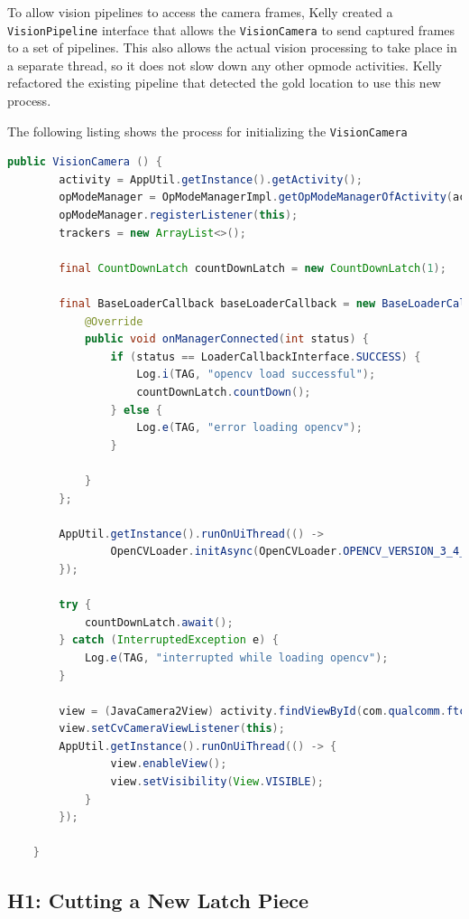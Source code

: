 \documentclass{article}
\begin{document}
To allow vision pipelines to access the camera frames, Kelly created a \texttt{VisionPipeline} interface that allows the \texttt{VisionCamera} to send captured frames to a set of pipelines. This also allows the actual vision processing to take place in a separate thread, so it does not slow down any other opmode activities. Kelly refactored the existing pipeline that detected the gold location to use this new process. 

The following listing shows the process for initializing the \texttt{VisionCamera}

\begin{lstlisting}[language=Java]
    public VisionCamera () {
        activity = AppUtil.getInstance().getActivity();
        opModeManager = OpModeManagerImpl.getOpModeManagerOfActivity(activity);
        opModeManager.registerListener(this);
        trackers = new ArrayList<>();

        final CountDownLatch countDownLatch = new CountDownLatch(1);

        final BaseLoaderCallback baseLoaderCallback = new BaseLoaderCallback(activity) {
            @Override
            public void onManagerConnected(int status) {
                if (status == LoaderCallbackInterface.SUCCESS) {
                    Log.i(TAG, "opencv load successful");
                    countDownLatch.countDown();
                } else {
                    Log.e(TAG, "error loading opencv");
                }

            }
        };

        AppUtil.getInstance().runOnUiThread(() -> 
                OpenCVLoader.initAsync(OpenCVLoader.OPENCV_VERSION_3_4_0, activity, baseLoaderCallback);
        });

        try {
            countDownLatch.await();
        } catch (InterruptedException e) {
            Log.e(TAG, "interrupted while loading opencv");
        }

        view = (JavaCamera2View) activity.findViewById(com.qualcomm.ftcrobotcontroller.R.id.cameraViewId);
        view.setCvCameraViewListener(this);
        AppUtil.getInstance().runOnUiThread(() -> {
                view.enableView();
                view.setVisibility(View.VISIBLE);
            }
        });

    }
\end{lstlisting}
\subsection{H1: Cutting a New Latch Piece}
\end{document}
